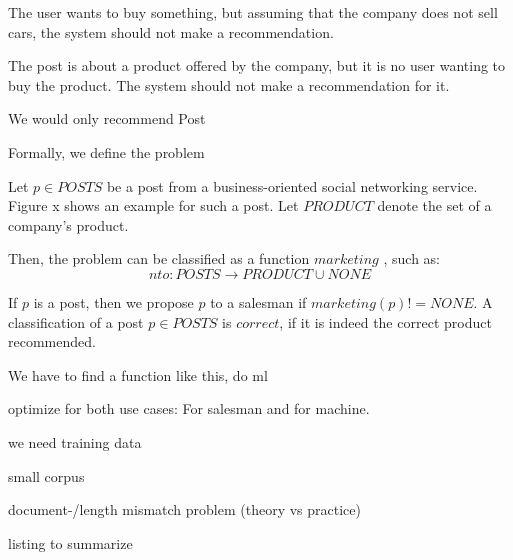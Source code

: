 \begin{post}
	\centering
	\caption{The user wants to buy something, but assuming that the company does not sell cars, the system should not make a recommendation.}
	\label{post:demand-only}
\end{post}

\begin{post}
	\centering
	\caption{The post is about a product offered by the company, but it is no user wanting to buy the product. The system should not make a recommendation for it.}
	\label{post:product-only}
\end{post}

We would only recommend Post

Formally, we define the problem  

Let $p \in POSTS$ be a post from a business-oriented social networking service.
Figure x shows an example for such a post.
Let $PRODUCT$ denote the set of a company's product.

Then, the problem can be classified as a function $marketing$ , such as:
\begin{displaymath}
	nto: POSTS \to PRODUCT \cup {NONE}
\end{displaymath}

If $p$ is a post, then we propose $p$ to a salesman if $marketing(p) != NONE$.
A classification of a post $p \in POSTS$ is $correct$, if it is indeed the correct product recommended.

We have to find a function like this, do ml

optimize for both use cases: For salesman and for machine.

we need training data

small corpus

document-/length mismatch problem (theory vs practice)

listing to summarize



